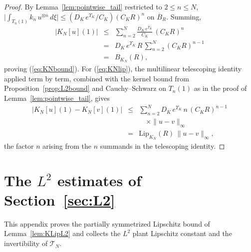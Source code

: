 \documentclass[amsthm]{autart}
\theoremstyle{plain}
\theoremstyle{definition}
\newcommand{\Tcal}{\mathcal{T}}
\newcommand{\Ltwo}{L^2}
\newcommand{\LipKn}{\mathrm{Lip}_{K_N}}
\begin{document}
\begin{proof}
By Lemma~\ref{lem:pointwise_tail} restricted to $2 \le n \le N$, $\bigl|\int_{T_n(1)} k_n\,u^{\otimes n}\,d\xi\bigr| \le (D_K\,e^{\Upsilon_K}/C_K)(C_K R)^n$ on $\overline B_R$. Summing,
\begin{eqnarray}
|K_N[u](1)| &\le & \sum_{n=2}^N \frac{D_K\,e^{\Upsilon_K}}{C_K}\,(C_K R)^n \nonumber\\
&=& D_K\,e^{\Upsilon_K}\,R\,\sum_{n=2}^N (C_K R)^{n-1} \nonumber \\
&=& B_{K_N}(R),
\label{eq:KNbound_proof}
\end{eqnarray}
proving (\ref{eq:KNbound}). For (\ref{eq:KNlip}), the multilinear telescoping identity applied term by term, combined with the kernel bound from Proposition~\ref{prop:L2bound} and Cauchy--Schwarz on $T_n(1)$ as in the proof of Lemma~\ref{lem:pointwise_tail}, gives
\begin{eqnarray}
|K_N[u](1) - K_N[v](1)| &\le & \sum_{n=2}^N D_K\,e^{\Upsilon_K}\,n\,(C_K R)^{n-1} \nonumber \\
&& \quad \times \|u - v\|_\infty \nonumber\\
&=& \LipKn(R)\,\|u - v\|_\infty,
\label{eq:KNlip_proof}
\end{eqnarray}
the factor $n$ arising from the $n$ summands in the telescoping identity.
\end{proof}

\section{The $\Ltwo$ estimates of Section~\ref{sec:L2}}\label{app:L2}

This appendix proves the partially symmetrized Lipschitz bound of Lemma~\ref{lem:KLipL2} and collects the $\Ltwo$ plant Lipschitz constant and the invertibility of $\Tcal_N$.
\end{document}
